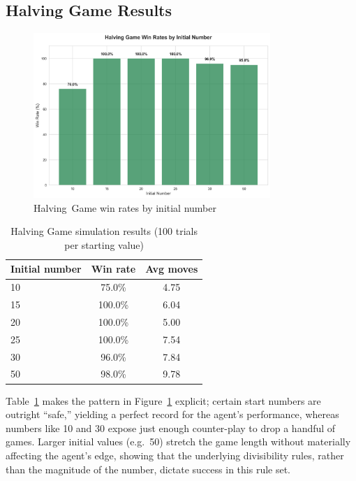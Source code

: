 \documentclass[12pt]{article}
\begin{document}
\subsection{Halving Game Results}

\begin{figure}[H]
    \centering
    \includegraphics[width=0.8\textwidth]{output/images/halving_win_rates.png}
    \caption{Halving Game win rates by initial number}
    \label{fig:halving_win_rates}
\end{figure}

\begin{table}[H]
    \centering
    \begin{tabular}{lcc}
        \toprule
        \textbf{Initial number} & \textbf{Win rate} & \textbf{Avg moves} \\
        \midrule
        10 & 75.0\% & 4.75 \\
        15 & 100.0\% & 6.04 \\
        20 & 100.0\% & 5.00 \\
        25 & 100.0\% & 7.54 \\
        30 & 96.0\% & 7.84 \\
        50 & 98.0\% & 9.78 \\
        \bottomrule
    \end{tabular}
    \caption{Halving Game simulation results (100 trials per starting value)}
    \label{tab:halving_results}
\end{table}

Table~\ref{tab:halving_results} makes the pattern in Figure~\ref{fig:halving_win_rates} explicit; certain start numbers are outright “safe,” yielding a perfect record for the agent's performance, whereas numbers like 10 and 30 expose just enough counter-play to drop a handful of games. Larger initial values (e.g.\ 50) stretch the game length without materially affecting the agent’s edge, showing that the underlying divisibility rules, rather than the magnitude of the number, dictate success in this rule set.
\end{document}
